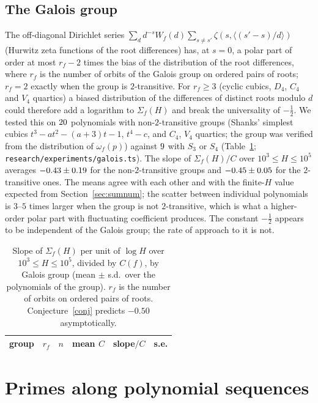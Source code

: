 \documentclass[11pt,a4paper]{article}
\theoremstyle{remark}\newtheorem{remark}[theorem]{Remark}
\begin{document}
\subsection{The Galois group}\label{sec:galois}

The off-diagonal Dirichlet series $\sum_dd^{-s}W_f(d)\sum_{s\ne s'}\zeta(s,\langle(s'-s)/d\rangle)$
(Hurwitz zeta functions of the root differences) has, at $s=0$, a polar part of order at most $r_f-2$
times the bias of the distribution of the root differences, where $r_f$ is the number of orbits of the
Galois group on ordered pairs of roots; $r_f=2$ exactly when the group is $2$-transitive. For
$r_f\ge3$ (cyclic cubics, $D_4$, $C_4$ and $V_4$ quartics) a biased distribution of the differences of
distinct roots modulo $d$ could therefore add a logarithm to $\Sigma_f(H)$ and break the universality
of $-\tfrac12$. We tested this on $20$ polynomials with non-$2$-transitive groups (Shanks' simplest
cubics $t^3-at^2-(a+3)t-1$, $t^4-c$, and $C_4$, $V_4$ quartics; the group was verified from the
distribution of $\omega_f(p)$) against $9$ with $S_3$ or $S_4$ (Table~\ref{tab:galois};
\texttt{research/experiments/galois.ts}). The slope of $\Sigma_f(H)/C$ over $10^3\le H\le10^5$ averages
$-0.43\pm0.19$ for the non-$2$-transitive groups and $-0.45\pm0.05$ for the
$2$-transitive ones. The means agree with each other and with the finite-$H$ value expected from
Section~\ref{sec:sumnum}; the scatter between individual polynomials is $3$--$5$ times larger when the
group is not $2$-transitive, which is what a higher-order polar part with fluctuating coefficient
produces. The constant $-\tfrac12$ appears to be independent of the Galois group; the rate of
approach to it is not.

\begin{table}[htbp]
\centering\small
\caption{Slope of $\Sigma_f(H)$ per unit of $\log H$ over $10^3\le H\le10^5$, divided by $C(f)$, by
Galois group (mean $\pm$ s.d.\ over the polynomials of the group). $r_f$ is the number of orbits on
ordered pairs of roots. Conjecture~\ref{conj} predicts $-0.50$ asymptotically.}\label{tab:galois}
\begin{tabular}{lrrrrr}
\toprule
group & $r_f$ & $n$ & mean $C$ & slope$/C$ & s.e.\\
\midrule

\end{tabular}
\end{table}

\FloatBarrier
\section{Primes along polynomial sequences}\label{sec:primes}
\end{document}
